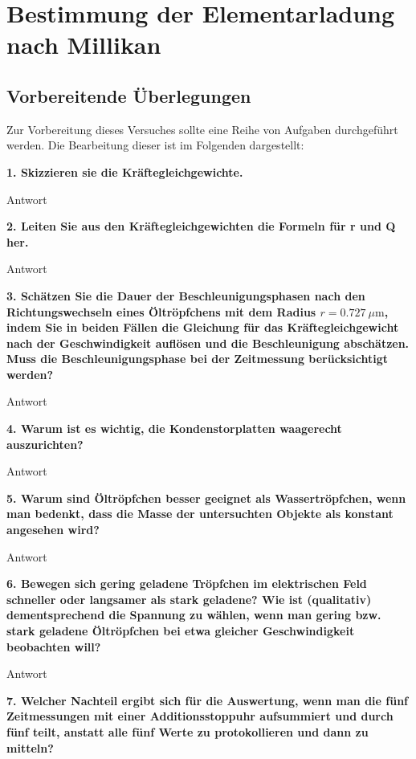 \section{Bestimmung der Elementarladung nach Millikan} 


\subsection{Vorbereitende Überlegungen}

Zur Vorbereitung dieses Versuches sollte eine Reihe von Aufgaben durchgeführt werden. 
Die Bearbeitung dieser ist im Folgenden dargestellt:
\vspace{0,5cm}

\noindent \textbf{1. Skizzieren sie die Kräftegleichgewichte.}

	Antwort

\noindent \textbf{2. Leiten Sie aus den Kräftegleichgewichten die Formeln für r und Q her.}

	Antwort

\noindent \textbf{3. Schätzen Sie die Dauer der Beschleunigungsphasen nach den Richtungswechseln eines Öltröpfchens mit dem Radius $r = \SI{0,727}{\mu\m}$, indem Sie in beiden Fällen die Gleichung für das Kräftegleichgewicht nach der Geschwindigkeit auflösen und die Beschleunigung abschätzen. Muss die Beschleunigungsphase bei der Zeitmessung berücksichtigt werden?}

	Antwort

\noindent \textbf{4. Warum ist es wichtig, die Kondenstorplatten waagerecht auszurichten?}

	Antwort

\noindent \textbf{5. Warum sind Öltröpfchen besser geeignet als Wassertröpfchen, wenn man bedenkt, dass die Masse der untersuchten Objekte als konstant angesehen wird?}

	Antwort

\noindent \textbf{6. Bewegen sich gering geladene Tröpfchen im elektrischen Feld schneller oder langsamer als stark geladene? Wie ist (qualitativ) dementsprechend die Spannung zu wählen, wenn man gering bzw. stark geladene Öltröpfchen bei etwa gleicher Geschwindigkeit beobachten will?}

	Antwort

\noindent \textbf{7. Welcher Nachteil ergibt sich für die Auswertung, wenn man die fünf Zeitmessungen mit einer Additionsstoppuhr aufsummiert und durch fünf teilt, anstatt alle fünf Werte zu protokollieren und dann zu mitteln?}

